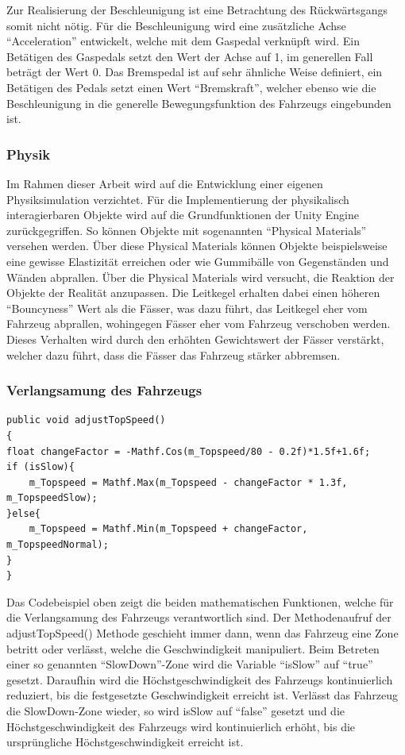 	Zur Realisierung der Beschleunigung ist eine Betrachtung des Rückwärtsgangs somit nicht nötig. Für die Beschleunigung wird eine zusätzliche Achse \enquote{Acceleration} entwickelt, welche mit dem Gaspedal verknüpft wird. Ein Betätigen des Gaspedals setzt den Wert der Achse auf 1, im generellen Fall beträgt der Wert 0. Das Bremspedal ist auf sehr ähnliche Weise definiert, ein Betätigen des Pedals setzt einen Wert \enquote{Bremskraft}, welcher ebenso wie die Beschleunigung in die generelle Bewegungsfunktion des Fahrzeugs eingebunden ist.


	\subsubsection{Physik}
	Im Rahmen dieser Arbeit wird auf die Entwicklung einer eigenen Physiksimulation verzichtet. Für die Implementierung der physikalisch interagierbaren Objekte wird auf die Grundfunktionen der Unity Engine zurückgegriffen. So können Objekte mit sogenannten \enquote{Physical Materials} versehen werden. Über diese Physical Materials können Objekte beispielsweise eine gewisse Elastizität erreichen oder wie Gummibälle von Gegenständen und Wänden abprallen. Über die Physical Materials wird versucht, die Reaktion der Objekte der Realität anzupassen. Die Leitkegel erhalten dabei einen höheren \enquote{Bouncyness} Wert als die Fässer, was dazu führt, das Leitkegel eher vom Fahrzeug abprallen, wohingegen Fässer eher vom Fahrzeug verschoben werden. Dieses Verhalten wird durch den erhöhten Gewichtswert der Fässer verstärkt, welcher dazu führt, dass die Fässer das Fahrzeug stärker abbremsen.

	\subsubsection{Verlangsamung des Fahrzeugs}
	\begin{lstlisting}
public void adjustTopSpeed()
{
float changeFactor = -Mathf.Cos(m_Topspeed/80 - 0.2f)*1.5f+1.6f;
if (isSlow){
    m_Topspeed = Mathf.Max(m_Topspeed - changeFactor * 1.3f, m_TopspeedSlow);
}else{
    m_Topspeed = Mathf.Min(m_Topspeed + changeFactor, m_TopspeedNormal);
}
}
    \end{lstlisting}
    Das Codebeispiel oben zeigt die beiden mathematischen Funktionen, welche für die Verlangsamung des Fahrzeugs verantwortlich sind. Der Methodenaufruf der adjustTopSpeed() Methode geschieht immer dann, wenn das Fahrzeug eine Zone betritt oder verlässt, welche die Geschwindigkeit manipuliert. Beim Betreten einer so genannten \enquote{SlowDown}-Zone wird die Variable \enquote{isSlow} auf \enquote{true} gesetzt. Daraufhin wird die Höchstgeschwindigkeit des Fahrzeugs kontinuierlich reduziert, bis die festgesetzte Geschwindigkeit erreicht ist. Verlässt das Fahrzeug die SlowDown-Zone wieder, so wird isSlow auf \enquote{false} gesetzt und die Höchstgeschwindigkeit des Fahrzeugs wird kontinuierlich erhöht, bis die ursprüngliche Höchstgeschwindigkeit erreicht ist.

